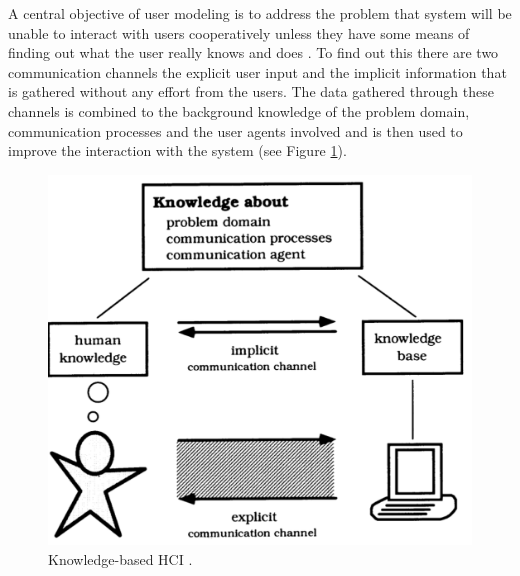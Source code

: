 \documentclass{sigchi}
\begin{document}
A central objective of user modeling is to address the problem that system will be unable to interact with users cooperatively unless they have some means of finding out what the user really knows and does \cite{fischer01}. To find out this there are two communication channels the explicit user input and the implicit information that is gathered without any effort from the users. The data gathered through these channels is combined to the background knowledge of the problem domain, communication processes and the user agents involved and is then used to improve the interaction with the system (see Figure \ref{know_hci}).

\begin{figure}[htp] %
\caption{Knowledge-based HCI \protect\cite{fischer01}.}   \label{know_hci}
\includegraphics[scale=0.45]{figures/knowledge_hci.pdf} 
\end{figure}
\end{document}
